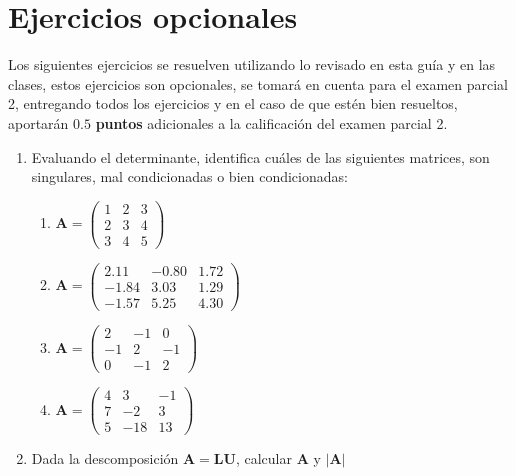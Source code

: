 \section{Ejercicios opcionales}
Los siguientes ejercicios se resuelven utilizando lo revisado en esta guía y en las clases, estos ejercicios son opcionales, se tomará en cuenta para el examen parcial 2, entregando todos los ejercicios y en el caso de que estén bien resueltos, aportarán $\mathbf{0.5}$ \textbf{puntos} adicionales a la calificación del examen parcial 2.
\begin{enumerate}
\item Evaluando el determinante, identifica cuáles de las siguientes matrices, son singulares, mal condicionadas o bien condicionadas:
\begin{multicols}{2}
	\begin{enumerate}
		\item $ \mathbf{A} =
				\begin{pmatrix}
					1 & 2 & 3 \\
					2 & 3 & 4 \\
					3 & 4 & 5
				\end{pmatrix} $
		\item $ \mathbf{A} =
				\begin{pmatrix}
					2.11 & -0.80 & 1.72 \\
					-1.84 & 3.03 & 1.29 \\
					-1.57 & 5.25 & 4.30
				\end{pmatrix} $
		\item $ \mathbf{A} =
				\begin{pmatrix}
					2 & -1 & 0 \\
					-1 & 2 & -1 \\
					0 & -1 & 2
				\end{pmatrix} $
		\item $ \mathbf{A} =
				\begin{pmatrix}
					4 & 3 & -1 \\
					7 & -2 & 3 \\
					5 & -18 & 13
				\end{pmatrix} $ 
	\end{enumerate}
\end{multicols}
\item Dada la descomposición $\mathbf{A} = \mathbf{LU}$, calcular $\mathbf{A}$ y $\vert \mathbf{A} \vert$
\end{enumerate}
